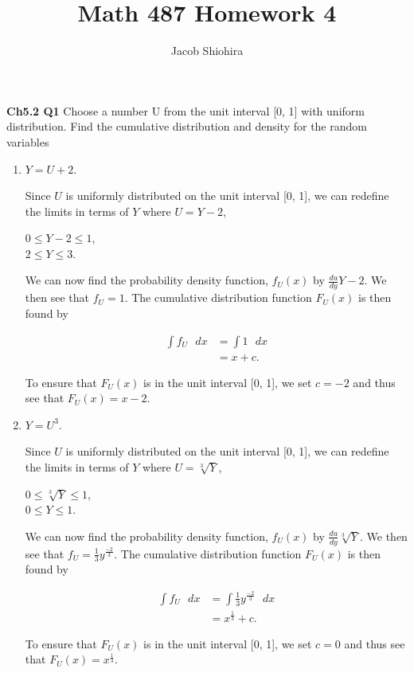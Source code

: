 \documentclass[12pt]{article}
\begin{document}
\title{Math 487 Homework 4}
\author{Jacob Shiohira}
\maketitle

\noindent
\textbf{Ch5.2 Q1} Choose a number U from the unit interval [0, 1] with uniform distribution. Find the cumulative distribution and density for the random variables

\begin{enumerate}[label=(\alph*)]
\item $Y = U + 2$.

\noindent
Since $U$ is uniformly distributed on the unit interval [0, 1], we can redefine the limits in terms of $Y$ where $U = Y - 2$, 

\begin{center}
$0 \leq Y - 2 \leq 1$, \\
$2 \leq Y \leq 3$.
\end{center}

\noindent
We can now find the probability density function, $f_U(x)$ by  $\frac{du}{dy} Y - 2$. We then see that $f_U = 1$. The cumulative distribution function $F_U(x)$ is then found by

\begin{align*}
\int f_U \text{ } dx & = \int 1 \text{ } dx  \\
& = x + c.
\end{align*}

\noindent
To ensure that $F_U(x)$ is in the unit interval [0, 1], we set $c = -2$ and thus see that $F_U(x) = x - 2$.

\item $Y = U^3$.

\noindent
Since $U$ is uniformly distributed on the unit interval [0, 1], we can redefine the limits in terms of $Y$ where $U = \sqrt[3]{Y}$, 

\begin{center}
$0 \leq \sqrt[3]{Y} \leq 1$, \\
$0 \leq Y \leq 1$.
\end{center}

\noindent
We can now find the probability density function, $f_U(x)$ by  $\frac{du}{dy} \sqrt[3]{Y}$. We then see that $f_U = \frac{1}{3} y^{\frac{-2}{3}}$. The cumulative distribution function $F_U(x)$ is then found by

\begin{align*}
\int f_U \text{ } dx & = \int \frac{1}{3} y^{\frac{-2}{3}} \text{ } dx  \\
& = x^{\frac{1}{3}} + c.
\end{align*}

\noindent
To ensure that $F_U(x)$ is in the unit interval [0, 1], we set $c = 0$ and thus see that $F_U(x) =  x^{\frac{1}{3}}$.
\end{enumerate}
\end{document}
